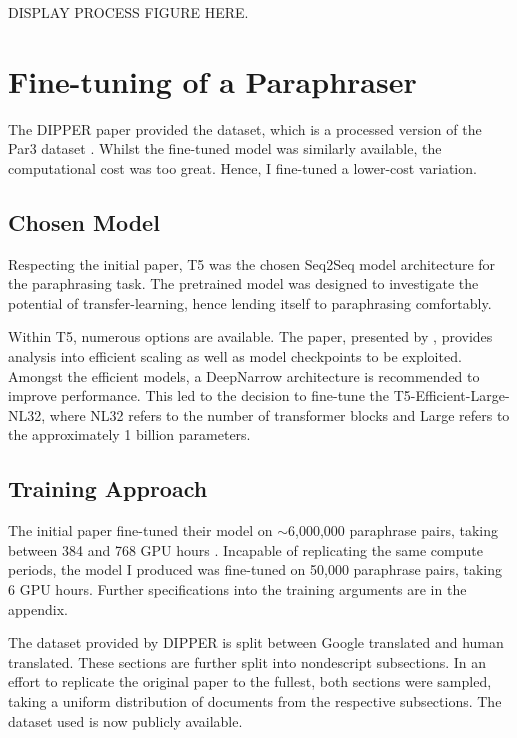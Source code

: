 \documentclass{l4proj}
\theoremstyle{definition}
\begin{document}
    DISPLAY PROCESS FIGURE HERE. 


\section{Fine-tuning of a Paraphraser}
    The DIPPER paper \citep{krishna2023paraphrasing} provided the dataset, which is a processed version of the Par3 dataset \citep{Par3_2022}. Whilst the fine-tuned model was similarly available, the computational cost was too great. Hence, I fine-tuned a lower-cost variation.

    \subsection{Chosen Model}
        Respecting the initial paper, T5 was the chosen Seq2Seq model architecture for the paraphrasing task. The pretrained model was designed to investigate the potential of transfer-learning, hence lending itself to paraphrasing comfortably. 

        Within T5, numerous options are available. The paper, presented by \citet{tay2022scale}, provides analysis into efficient scaling as well as model checkpoints to be exploited. Amongst the efficient models, a DeepNarrow architecture is recommended to improve performance. This led to the decision to fine-tune the T5-Efficient-Large-NL32, where NL32 refers to the number of transformer blocks and Large refers to the approximately 1 billion parameters.

    \subsection{Training Approach}
        The initial paper fine-tuned their model on $\sim$6,000,000 paraphrase pairs, taking between 384 and 768 GPU hours \citep{krishna2023paraphrasing}. Incapable of replicating the same compute periods, the model I produced was fine-tuned on 50,000 paraphrase pairs, taking 6 GPU hours. %
        Further specifications into the training arguments are in the appendix. %

        The dataset provided by DIPPER is split between Google translated and human translated. These sections are further split into nondescript subsections. In an effort to replicate the original paper to the fullest, both sections were sampled, taking a uniform distribution of documents from the respective subsections. 
        The dataset used is now publicly available. %
        
\end{document}
